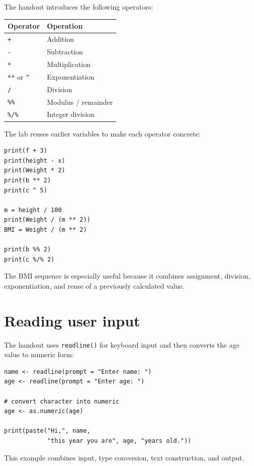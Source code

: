 The handout introduces the following operators:

\begin{dstable}
\begin{tabularx}{\linewidth}{@{}p{2.2cm}X@{}}
\toprule
\rowcolor{DSPaleBlue!92}
Operator & Operation \\
\midrule
\texttt{+} & Addition \\
\texttt{-} & Subtraction \\
\texttt{*} & Multiplication \\
\texttt{**} or \texttt{\^} & Exponentiation \\
\texttt{/} & Division \\
\texttt{\%\%} & Modulus / remainder \\
\texttt{\%/\%} & Integer division \\
\bottomrule
\end{tabularx}
\end{dstable}

The lab reuses earlier variables to make each operator concrete:

\begin{lstlisting}[style=dsr]
print(f + 3)
print(height - x)
print(Weight * 2)
print(b ** 2)
print(c ^ 5)

m = height / 100
print(Weight / (m ** 2))
BMI = Weight / (m ** 2)

print(b %% 2)
print(c %/% 2)
\end{lstlisting}

The BMI sequence is especially useful because it combines assignment, division, exponentiation, and reuse of a previously calculated value.

\section{Reading user input}

The handout uses \texttt{readline()} for keyboard input and then converts the age value to numeric form:

\begin{lstlisting}[style=dsr]
name <- readline(prompt = "Enter name: ")
age <- readline(prompt = "Enter age: ")

# convert character into numeric
age <- as.numeric(age)

print(paste("Hi,", name,
            "this year you are", age, "years old."))
\end{lstlisting}

This example combines input, type conversion, text construction, and output.

